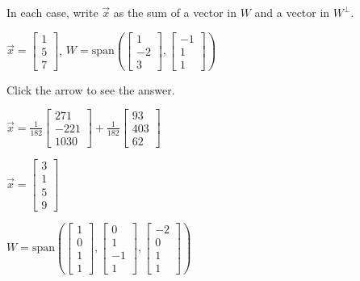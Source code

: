 \documentclass{ximera}
\begin{document}
\begin{problem}
In each case, write $\vec{x}$ as the sum of a vector in $W$ and a vector in $W^\perp$.

\begin{problem}\label{OrthoDecomp1}
$\vec{x} = \begin{bmatrix}1\\ 5\\ 7\end{bmatrix}$, $W = \mbox{span}\left(\begin{bmatrix}1\\ -2\\ 3\end{bmatrix}, \begin{bmatrix}-1\\ 1\\ 1\end{bmatrix}\right)$

Click the arrow to see the answer.
\begin{expandable}
$\vec{x} = \frac{1}{182}\begin{bmatrix}271\\-221\\1030\end{bmatrix}  + \frac{1}{182}\begin{bmatrix}93\\403\\62\end{bmatrix}$
\end{expandable}
\end{problem}

\begin{problem}\label{OrthoDecomp3}
$\vec{x} = \begin{bmatrix}3\\ 1\\ 5\\ 9\end{bmatrix}$

$W = \mbox{span}\left(\begin{bmatrix}1\\ 0\\ 1\\ 1\end{bmatrix}, \begin{bmatrix}0\\ 1\\ -1\\ 1\end{bmatrix}, \begin{bmatrix}-2\\ 0\\ 1\\ 1\end{bmatrix}\right)$


\end{problem}
\end{problem}
\end{document}
